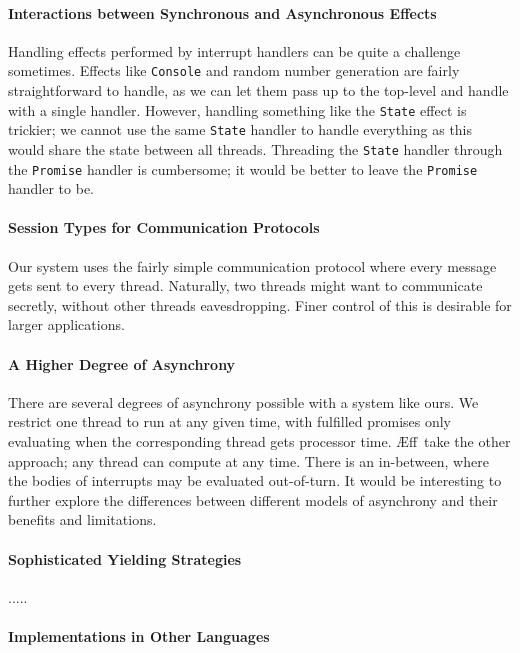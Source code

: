 \documentclass[msc,deptreport,cs]{infthesis} %
\newcommand{\code}[1]{\lstinline{#1}}
\newcommand\aeff{{\AE}ff\xspace}
\begin{document}
\paragraph*{Interactions between Synchronous and Asynchronous Effects}
Handling effects performed by interrupt handlers can be quite a challenge
sometimes. Effects like \code{Console} and random number generation are fairly
straightforward to handle, as we can let them pass up to the top-level and
handle with a single handler. However, handling something like the \code{State}
effect is trickier; we cannot use the same \code{State} handler to handle
everything as this would share the state between all threads. Threading the
\code{State} handler through the \code{Promise} handler is cumbersome; it would
be better to leave the \code{Promise} handler to be.

\paragraph*{Session Types for Communication Protocols}
Our system uses the fairly simple communication protocol where every message
gets sent to every thread. Naturally, two threads might want to communicate
secretly, without other threads eavesdropping. Finer control of this is
desirable for larger applications.

\paragraph*{A Higher Degree of Asynchrony}
There are several degrees of asynchrony possible with a system like ours. We
restrict one thread to run at any given time, with fulfilled promises only
evaluating when the corresponding thread gets processor time. \aeff~take the
other approach; any thread can compute at any time. There is an in-between,
where the bodies of interrupts may be evaluated out-of-turn. It would be
interesting to further explore the differences between different models of
asynchrony and their benefits and limitations.

\paragraph*{Sophisticated Yielding Strategies}
.....

\paragraph*{Implementations in Other Languages}
\end{document}

